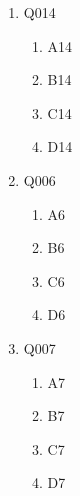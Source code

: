 \documentclass[12pt]{article}
\begin{document}
\begin{enumerate}
\begin{enumerate}[label=(\Alph*)]
        \item A4
        
        \item B4
        
        \item C4
        
        \item D4
        
    \end{enumerate}

    \item Q014
    \begin{enumerate}[label=(\Alph*)]
        
        \item A14
        
        \item B14
        
        \item C14
        
        \item D14
        
    \end{enumerate}

    \item Q006
    \begin{enumerate}[label=(\Alph*)]
        
        \item A6
        
        \item B6
        
        \item C6
        
        \item D6
        
    \end{enumerate}

    \item Q007
    \begin{enumerate}[label=(\Alph*)]
        
        \item A7
        
        \item B7
        
        \item C7
        
        \item D7
        
    \end{enumerate}


\end{enumerate}
\end{document}
